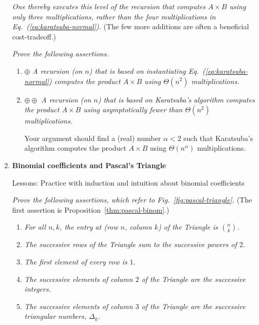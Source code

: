 \begin{enumerate}
{\em One thereby executes this level of the recursion that computes $A \times B$ using only {\em three} multiplications, rather than the four multiplications in Eq.~(\ref{eq:karatsuba-normal}).}  (The few more additions are often a beneficial cost-tradeoff.)

\medskip

{\em Prove the following assertions.}
\begin{enumerate}
\item
$\oplus$
{\em A recursion (on $n$) that is based on instantiating Eq.~(\ref{eq:karatsuba-normal}) computes the product $A \times B$ using $\Theta(n^2)$ multiplications.}

\medskip\item
$\oplus \oplus$
{\em A recursion (on $n$) that is based on Karatsuba's algorithm computes the product $A \times B$ using {\em asymptotically fewer than} $\Theta(n^2)$ multiplications.}

\smallskip

Your argument should find a (real) number $\alpha < 2$ such that Karatsuba's algorithm computes the product $A \times B$ using $\Theta(n^\alpha)$ multiplications.
\end{enumerate}

\medskip\item
{\bf Binomial coefficients and Pascal's Triangle}

{\sc Lessons:}
Practice with induction and intuition about binomial coefficients

\smallskip

{\em  Prove the following assertions, which refer to Fig.~\ref{fig:pascal-triangle}.} (The first assertion is Proposition~\ref{thm:pascal-binom}.)
  \begin{enumerate}
  \item
{\em For all $n,k$, the entry at (row $n$, column $k$) of the Triangle is $\displaystyle {n \choose k}$.}
  
  \medskip\item
{\em The successive rows of the Triangle sum to the successive powers of $2$.}

  \medskip\item
{\em The first element of every row is $1$.}

  \medskip\item
{\em The successive elements of column $2$ of the Triangle are the successive integers.}

  \medskip\item
{\em The successive elements of column $3$ of the Triangle are the successive triangular numbers, $\Delta_k$.}


\end{enumerate}
\end{enumerate}
